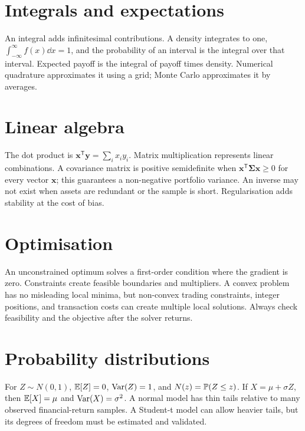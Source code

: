 \section{Integrals and expectations}
An integral adds infinitesimal contributions. A density integrates to one, $\int_{-\infty}^{\infty}f(x)\dd x=1$, and the probability of an interval is the integral over that interval. Expected payoff is the integral of payoff times density. Numerical quadrature approximates it using a grid; Monte Carlo approximates it by averages.

\section{Linear algebra}
The dot product is $\mathbf{x}^{\mathsf T}\mathbf{y}=\sum_ix_iy_i$. Matrix multiplication represents linear combinations. A covariance matrix is positive semidefinite when $\mathbf{x}^{\mathsf T}\boldsymbol\Sigma\mathbf{x}\geq0$ for every vector $\mathbf{x}$; this guarantees a non-negative portfolio variance. An inverse may not exist when assets are redundant or the sample is short. Regularisation adds stability at the cost of bias.

\section{Optimisation}
An unconstrained optimum solves a first-order condition where the gradient is zero. Constraints create feasible boundaries and multipliers. A convex problem has no misleading local minima, but non-convex trading constraints, integer positions, and transaction costs can create multiple local solutions. Always check feasibility and the objective after the solver returns.

\section{Probability distributions}
For $Z\sim N(0,1)$, $\mathbb{E}[Z]=0$, $\operatorname{Var}(Z)=1$, and $N(z)=\mathbb{P}(Z\leq z)$. If $X=\mu+\sigma Z$, then $\mathbb{E}[X]=\mu$ and $\operatorname{Var}(X)=\sigma^2$. A normal model has thin tails relative to many observed financial-return samples. A Student-t model can allow heavier tails, but its degrees of freedom must be estimated and validated.

